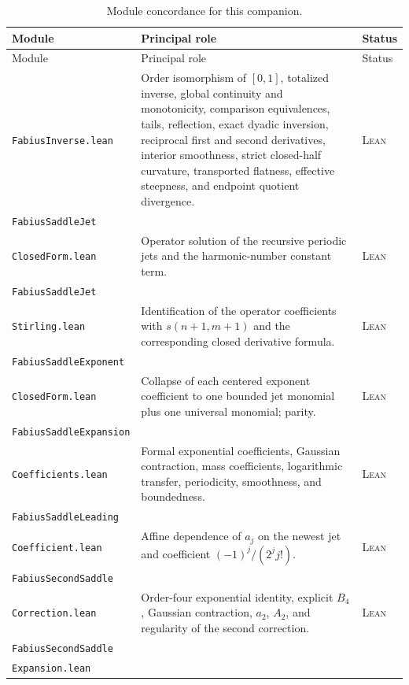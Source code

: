 \documentclass[11pt,oneside]{article}
\theoremstyle{definition}
\theoremstyle{remark}
\newcommand{\Formalized}{\textsc{Lean}}
\begin{document}
\begingroup
\small
\begin{longtable}{>{\raggedright\arraybackslash}p{}
                  >{\raggedright\arraybackslash}p{}
                  >{\raggedright\arraybackslash}p{}}
\caption{Module concordance for this companion.}
\label{tab:module-concordance}\\
\toprule
Module & Principal role & Status\\
\midrule
\endfirsthead
\toprule
Module & Principal role & Status\\
\midrule
\endhead
\texttt{FabiusInverse.lean} &
Order isomorphism of $[0,1]$, totalized inverse, global continuity and
monotonicity, comparison equivalences, tails, reflection, exact dyadic
inversion, reciprocal first and second derivatives, interior smoothness,
strict closed-half curvature, transported flatness, effective steepness, and
endpoint quotient divergence. & \Formalized\\
\texttt{FabiusSaddleJet}\\\texttt{ClosedForm.lean} &
Operator solution of the recursive periodic jets and the harmonic-number
constant term. & \Formalized\\
\texttt{FabiusSaddleJet}\\\texttt{Stirling.lean} &
Identification of the operator coefficients with
$s(n+1,m+1)$ and the corresponding closed derivative formula. &
\Formalized\\
\texttt{FabiusSaddleExponent}\\\texttt{ClosedForm.lean} &
Collapse of each centered exponent coefficient to one bounded jet
monomial plus one universal monomial; parity. & \Formalized\\
\texttt{FabiusSaddleExpansion}\\\texttt{Coefficients.lean} &
Formal exponential coefficients, Gaussian contraction, mass
coefficients, logarithmic transfer, periodicity, smoothness, and
boundedness. & \Formalized\\
\texttt{FabiusSaddleLeading}\\\texttt{Coefficient.lean} &
Affine dependence of $a_j$ on the newest jet and coefficient
$(-1)^j/(2^jj!)$. & \Formalized\\
\texttt{FabiusSecondSaddle}\\\texttt{Correction.lean} &
Order-four exponential identity, explicit $B_4$, Gaussian contraction,
$a_2$, $A_2$, and regularity of the second correction. & \Formalized\\
\texttt{FabiusSecondSaddle}\\\texttt{Expansion.lean} &

\end{longtable}
\end{document}
